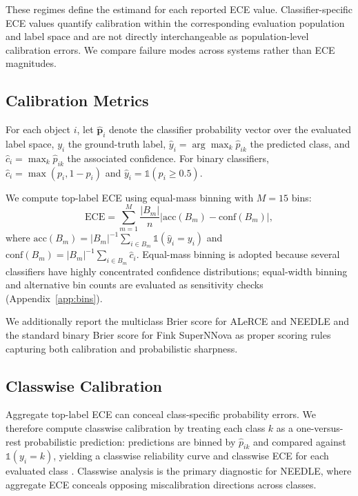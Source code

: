 \documentclass[twocolumn]{aastex631}
\begin{document}
These regimes define the estimand for each reported ECE value.
Classifier-specific ECE values quantify calibration within the
corresponding evaluation population and label space and are not
directly interchangeable as population-level calibration errors.
We compare failure modes across systems rather than ECE magnitudes.

\subsection{Calibration Metrics}\label{sec:cal_metrics}

For each object $i$, let $\hat{\mathbf{p}}_i$ denote the
classifier probability vector over the evaluated label space,
$y_i$ the ground-truth label, $\hat{y}_i = \arg\max_k
\hat{p}_{ik}$ the predicted class, and $\hat{c}_i = \max_k
\hat{p}_{ik}$ the associated confidence. For binary classifiers,
$\hat{c}_i = \max(p_i, 1-p_i)$ and $\hat{y}_i =
\mathbb{1}(p_i \geq 0.5)$.

We compute top-label ECE using equal-mass binning with $M = 15$
bins:
\begin{equation}
    \mathrm{ECE} = \sum_{m=1}^{M} \frac{|B_m|}{n}
    \left| \mathrm{acc}(B_m) - \mathrm{conf}(B_m) \right|,
    \label{eq:ece_methods}
\end{equation}
where $\mathrm{acc}(B_m) = |B_m|^{-1} \sum_{i \in B_m}
\mathbb{1}(\hat{y}_i = y_i)$ and $\mathrm{conf}(B_m) =
|B_m|^{-1} \sum_{i \in B_m} \hat{c}_i$. Equal-mass binning is
adopted because several classifiers have highly concentrated
confidence distributions; equal-width binning and alternative bin
counts are evaluated as sensitivity checks
(Appendix~\ref{app:bins}).

We additionally report the multiclass Brier score
\citep{brier1950} for ALeRCE and NEEDLE and the standard binary
Brier score for Fink SuperNNova as proper scoring rules capturing
both calibration and probabilistic sharpness.

\subsection{Classwise Calibration}\label{sec:classwise_methods}

Aggregate top-label ECE can conceal class-specific probability
errors. We therefore compute classwise calibration by treating
each class $k$ as a one-versus-rest probabilistic prediction:
predictions are binned by $\hat{p}_{ik}$ and compared against
$\mathbb{1}(y_i = k)$, yielding a classwise reliability curve
and classwise ECE for each evaluated class \citep{nixon2019}.
Classwise analysis is the primary diagnostic for NEEDLE, where
aggregate ECE conceals opposing miscalibration directions across
classes.
\end{document}
